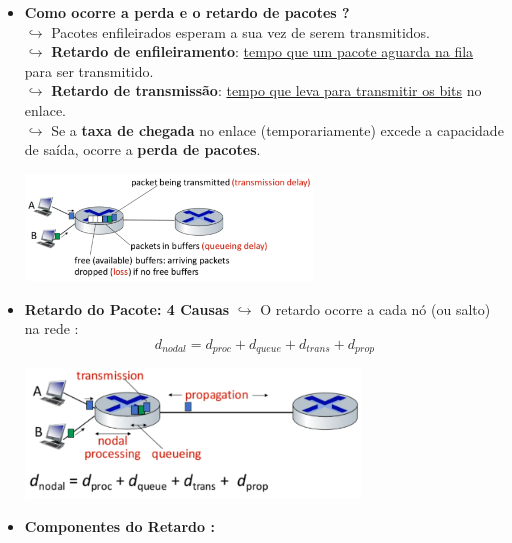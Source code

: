     \begin{itemize}
        \item \textbf{Como ocorre a perda e o retardo de pacotes ?} \\
            $\hookrightarrow$ Pacotes enfileirados esperam a sua vez de serem transmitidos. \\
            $\hookrightarrow$ \textbf{Retardo de enfileiramento}: \underline{tempo que um pacote aguarda na fila} para ser transmitido. \\
            $\hookrightarrow$ \textbf{Retardo de transmissão}: \underline{tempo que leva para transmitir os bits} no enlace. \\
            $\hookrightarrow$ Se a \textbf{taxa de chegada} no enlace (temporariamente) excede a capacidade de saída, ocorre a \textbf{perda de pacotes}. 
      

        \begin{center}
            \includegraphics[width=0.6\textwidth]{img/cap-01/delay1.png}
        \end{center}

        \item \textbf{Retardo do Pacote: 4 Causas}
            $\hookrightarrow$ O retardo ocorre a cada nó (ou salto) na rede : 
            \[
            d_{nodal} = d_{proc} + d_{queue} + d_{trans} + d_{prop}
            \]
        

        \begin{center}
            \includegraphics[width=0.7\textwidth]{img/cap-01/delay2.png}
        \end{center}

        \item \textbf{Componentes do Retardo :}
        

\end{itemize}
